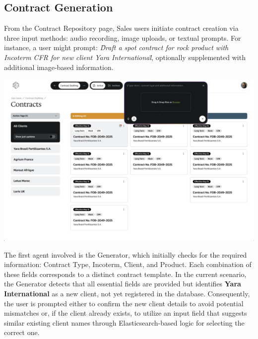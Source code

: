 \subsection{Contract Generation}
From the Contract Repository page, Sales users initiate contract creation via three input methods: audio recording, image uploads, or textual prompts. For instance, a user might prompt: \textit{\"Draft a spot contract for rock product with Incoterm CFR for new client Yara International\"}, optionally supplemented with additional image-based information.

\begin{center}
    \centering
    \includegraphics[width=1\textwidth]{Images/Generate Contract Component.png}
    \label{fig:contract_creation_component}
\end{center}

The first agent involved is the Generator, which initially checks for the required information: Contract Type, Incoterm, Client, and Product. Each combination of these fields corresponds to a distinct contract template. In the current scenario, the Generator detects that all essential fields are provided but identifies \textbf{Yara International} as a new client, not yet registered in the database. Consequently, the user is prompted either to confirm the new client details to avoid potential mismatches or, if the client already exists, to utilize an input field that suggests similar existing client names through Elasticsearch-based logic for selecting the correct one.


